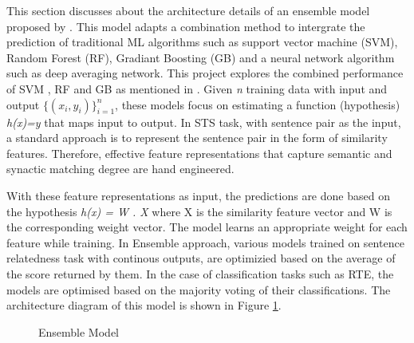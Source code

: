 \documentclass[12pt]{report} %
\begin{document}
	This section discusses about the architecture details of an ensemble model proposed by \cite{tian2017ecnu}. This model adapts a combination method to intergrate the prediction of traditional ML algorithms such as support vector machine (SVM), Random Forest (RF), Gradiant Boosting (GB) and a neural network algorithm such as deep averaging network. This project explores the combined performance of SVM , RF and GB as mentioned in \citep{tian2017ecnu}. Given \textit{n} training data with input and output $ \{(x_i,y_i)\}^{n}_{i=1} $, these models focus on estimating a function (hypothesis) \textit{h(x)=y} that maps input to output. In STS task, with sentence pair as the input, a standard approach is to represent the sentence pair in the form of similarity features. Therefore,  effective feature representations that capture semantic and synactic matching degree are hand engineered. 
	
	With these feature representations as input, the predictions are done based on the hypothesis \textit{h(x) = W . X} where X is the similarity feature vector and W is the corresponding weight vector.  The model learns an appropriate weight for each feature while training. In Ensemble approach, various models trained on sentence relatedness task with continous outputs, are optimizied based on the average of the score returned by them. In the case of classification tasks such as RTE, the models are optimised based on the majority voting of their classifications. The architecture diagram of this model is shown in Figure \ref{ensemble}.
	
	\begin{figure}[!tbp]
		\centering
		\caption{Ensemble Model \citep{tian2017ecnu}}
		\label{ensemble}
	\end{figure}
	
\end{document}

